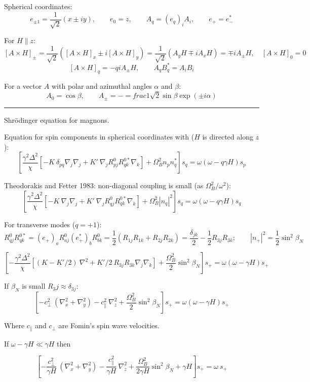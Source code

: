 \documentclass[a4paper]{article}
\begin{document}
Spherical coordinates:
$$
e_{\pm1} = \frac{1}{\sqrt2} (x\pm iy),\qquad
e_0 = z,\qquad
A_q = (e_q)_i A_i,\qquad
e_+ = e_-^*
$$

For $H \parallel z$:
$$
[A \times H]_{\pm} = \frac{1}{\sqrt2}([A\times H]_x \pm i[A\times H]_y) =
\frac{1}{\sqrt2}(A_y H \mp i A_x H) = \mp i A_{\pm} H,\quad [A \times H]_0=0
$$
$$
[A \times H]_q = -q i A_{\pm} H,\qquad
A_q B^*_{q} = A_i B_i
$$

For a vector $A$ with polar and azimuthal angles $\alpha$ and $\beta$:
$$
A_0 = \cos\beta,\qquad
A_\pm = -=frac{1}{\sqrt2}\sin\beta\exp(\pm i\alpha)
$$

\eject
\hrule
\medskip

Shr\"odinger equation for magnons.

Equation for spin components in spherical coordinates with
($H$ is directed along $z$):
$$
\left[
\frac{\gamma^2\Delta^2}{\chi}
  [-K\ \delta_{pq} \nabla_j\nabla_j
 + K'\ \nabla_j R^0_{pj}R^{0*}_{qk}\nabla_k]
+ \Omega_B^2 n_p n_q^*
\right] s_q =
\omega(\omega-q\gamma H) s_p
$$

Theodorakis and Fetter 1983: non-diagonal coupling is small
(as $\Omega_B^2/\omega^2$):
$$
\left[
\frac{\gamma^2\Delta^2}{\chi}
  [-K\ \nabla_j\nabla_j
 + K'\ \nabla_j R^0_{qj}R^{0*}_{qk}\nabla_k]
+ \Omega_B^2 |n_q|^2
\right] s_q =
\omega(\omega-q\gamma H) s_q
$$

For transverse modes ($q=+1$):
$$
R^0_{qj} R^{0*}_{qk}
= (e_{+})_a R^0_{aj} (e_{+}^*)_b R^{0}_{bk}
= \frac12 (R_{1j}R_{1k}+R_{2j}R_{2k})
= \frac{\delta_{jk}}{2}  - \frac12 R_{3j}R_{3k};
\qquad
|n_{+}|^2 = \frac12 \sin^2\beta_N
$$

$$
\left[ -
\frac{\gamma^2\Delta^2}{\chi}
  \left[(K-K'/2)\ \nabla^2
  + K'/2\ R_{3j}R_{3k} \nabla_j\nabla_k
  \right]
+ \frac{\Omega_B^2}{2} \sin^2\beta_N
\right] s_{+} =
\omega(\omega-\gamma H) s_{+}
$$

If $\beta_N$ is small $R_3j \approx \delta_{3j}$:
$$
\left[
- {c_\perp^2}\ (\nabla_x^2+\nabla_y^2)
- {c_\parallel^2}\ \nabla_z^2
+ \frac{\Omega_B^2}{2} \sin^2\beta_N
\right] s_{+} =
\omega(\omega-\gamma H) s_{+}
$$

Where $c_\parallel$ and $c_\perp$ are Fomin's spin wave velocities.

If $\omega-\gamma H \ll \gamma H$ then

$$
\left[
- \frac{c_\perp^2}{\gamma H}\ (\nabla_x^2+\nabla_y^2)
- \frac{c_\parallel^2}{\gamma H}\ \nabla_z^2
+ \frac{\Omega_B^2}{2\gamma H} \sin^2\beta_N + \gamma H
\right] s_{+} =
\omega\ s_{+}
$$
\end{document}
